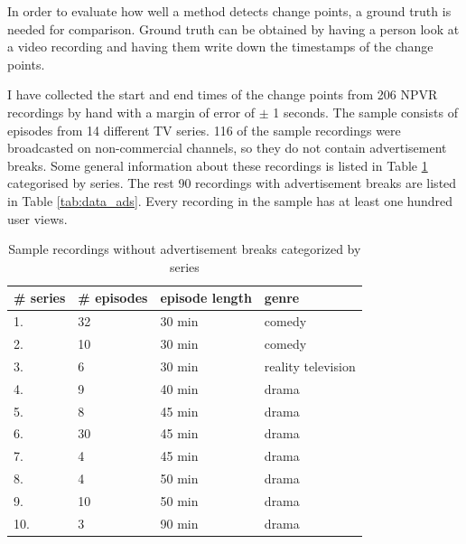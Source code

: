 In order to evaluate how well a method detects change points, a ground truth is needed for comparison. Ground truth can be obtained by having a person look at a video recording and having them write down the timestamps of the change points.

I have collected the start and end times of the change points from 206 NPVR recordings by hand with a margin of error of $\pm$ 1 seconds. The sample consists of episodes from 14 different TV series. 116 of the sample recordings were broadcasted on non-commercial channels, so they do not contain advertisement breaks. Some general information about these recordings is listed in Table \ref{tab:data_no_ads} categorised by series. The rest 90 recordings with advertisement breaks are listed in Table \ref{tab:data_ads}. Every recording in the sample has at least one hundred user views.

\begin{table}[h]
    \begin{center}
    \begin{tabular}{|p{15mm}|p{20mm}|p{28mm}|p{30mm}|} %
        \hline
        \textbf{\# series} & \textbf{\# episodes} & \textbf{episode length} & \textbf{genre}  \\ \hline
        1. & 32 & 30 min & comedy\\ \hline
        2. & 10 & 30 min & comedy\\ \hline
        3. &  6 & 30 min & reality television\\ \hline
        4. &  9 & 40 min & drama\\ \hline
        5. &  8 & 45 min & drama\\ \hline
        6. & 30 & 45 min & drama\\ \hline
        7. &  4 & 45 min & drama\\ \hline
        8. &  4 & 50 min & drama\\ \hline
        9. & 10 & 50 min & drama\\ \hline
        10. & 3 & 90 min & drama\\ \hline
    \end{tabular}
    \end{center}
    \caption{Sample recordings without advertisement breaks categorized by series}
    \label{tab:data_no_ads}
\end{table}

